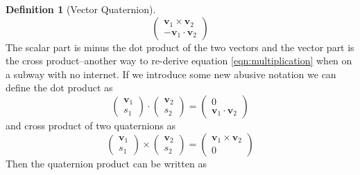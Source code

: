 \documentclass{amsart}
\theoremstyle{definition}
\newtheorem{definition}[theorem]{Definition}
\theoremstyle{remark}
\numberwithin{equation}{section}
\begin{document}
\begin{definition}[Vector Quaternion]
\begin{equation}
\begin{pmatrix}
      \mathbf{v}_1 \times \mathbf{v}_2\\
      -\mathbf{v}_1\cdot \mathbf{v}_2
    \end{pmatrix}
  \end{equation}
  The scalar part is minus the dot product of the two vectors and the vector part is the cross product--another way to re-derive equation \ref{eqn:multiplication} when on a subway with no internet. If we introduce some new abusive notation we can define the dot product as
  \begin{equation}
    \begin{pmatrix}
      \mathbf{v}_1 \\
      s_1
    \end{pmatrix}
    \cdot
    \begin{pmatrix}
      \mathbf{v}_2 \\
      s_2
    \end{pmatrix}
    =
    \begin{pmatrix}
      0 \\
      \mathbf{v}_1 \cdot \mathbf{v}_2
    \end{pmatrix}
  \end{equation}
  and cross product of two quaternions as
  \begin{equation}
    \begin{pmatrix}
      \mathbf{v}_1 \\
      s_1
    \end{pmatrix}
    \times
    \begin{pmatrix}
      \mathbf{v}_2 \\
      s_2
    \end{pmatrix}
    =
    \begin{pmatrix}
      \mathbf{v}_1 \times \mathbf{v}_2 \\
      0
    \end{pmatrix}
  \end{equation}
  Then the quaternion product can be written as
\end{definition}
\end{document}
